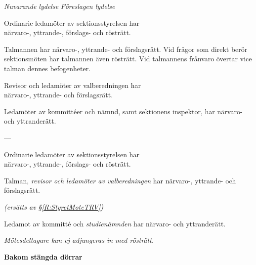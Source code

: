 \documentclass{article}
\newenvironment{lydelse}
    {\begin{paracol}{2}%
        \emph{Nuvarande lydelse}%
        \switchcolumn%
        \emph{Föreslagen lydelse}%
    \end{paracol}%
    \begin{enumerate}[label=\thesubsection.\arabic*]%
    \begin{paracol}{2}%
    }{\end{paracol}\end{enumerate}}
\begin{document}
\begin{lydelse}
    \setcounter{section}{4}
    \setcounter{subsection}{2}
    \setcounter{enumi}{4}
    \item Ordinarie ledamöter av sektionsstyrelsen har \\ närvaro-, yttrande-, förslags- och rösträtt. 
    \item Talmannen har närvaro-, yttrande- och förslagsrätt. Vid frågor som direkt berör sektionsmöten har talmannen även rösträtt. Vid talmannens frånvaro övertar vice talman dennes befogenheter. 
    \item Revisor och ledamöter av valberedningen har \\ närvaro-, yttrande- och förslagsrätt.
    \item Ledamöter av kommittéer och nämnd, samt sektionens inspektor, har närvaro- och yttranderätt.
    \item[] ---
    \setcounter{section}{3}
    \switchcolumn
    \setcounter{section}{3}
    \setcounter{subsection}{2}
    \setcounter{enumi}{3}
    \item Ordinarie ledamöter av sektionsstyrelsen har \\ närvaro-, yttrande-, förslags- och rösträtt. 

    \item Talman, \emph{revisor och ledamöter av valberedningen} har närvaro-, yttrande- och förslagsrätt.
    \label{R:StyretMoteTRV}
    
    \vspace{2.4em}
    \item[] \emph{(ersätts av \S \ref{R:StyretMoteTRV})}
    
    \vspace{1.2em}
    \item Ledamot av kommitté och \emph{studienämnden} har närvaro- och yttranderätt. %
    		
    \item \emph{Mötesdeltagare kan ej adjungeras in med rösträtt.}
\end{lydelse}
\textbf{Bakom stängda dörrar}
\end{document}
